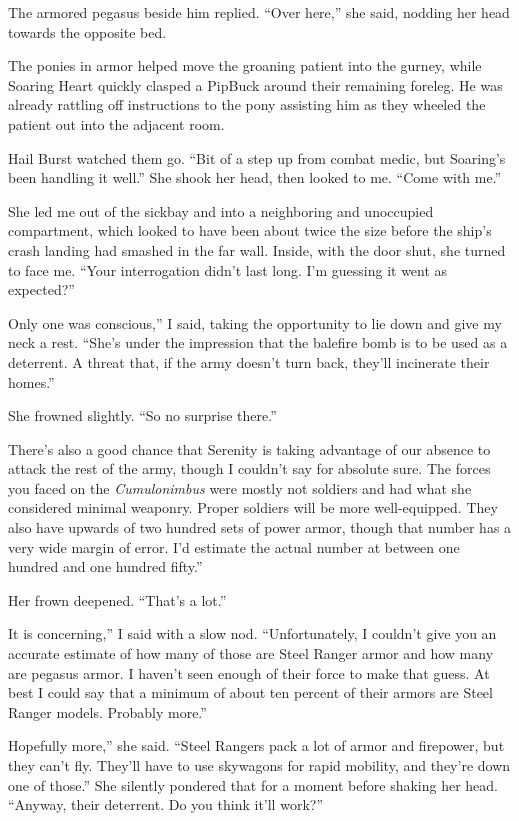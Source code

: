 The armored pegasus beside him replied. “Over here,” she said, nodding her head towards the opposite bed.

The ponies in armor helped move the groaning patient into the gurney, while Soaring Heart quickly clasped a PipBuck around their remaining foreleg. He was already rattling off instructions to the pony assisting him as they wheeled the patient out into the adjacent room.

Hail Burst watched them go. “Bit of a step up from combat medic, but Soaring’s been handling it well.” She shook her head, then looked to me. “Come with me.”

She led me out of the sickbay and into a neighboring and unoccupied compartment, which looked to have been about twice the size before the ship’s crash landing had smashed in the far wall. Inside, with the door shut, she turned to face me. “Your interrogation didn’t last long. I’m guessing it went as expected?”

\leavevmode{}Only one was conscious,” I said, taking the opportunity to lie down and give my neck a rest. “She’s under the impression that the balefire bomb is to be used as a deterrent. A threat that, if the army doesn’t turn back, they’ll incinerate their homes.”

She frowned slightly. “So no surprise there.”

\leavevmode{}There’s also a good chance that Serenity is taking advantage of our absence to attack the rest of the army, though I couldn’t say for absolute sure. The forces you faced on the \textit{Cumulonimbus} were mostly not soldiers and had what she considered minimal weaponry. Proper soldiers will be more well-equipped. They also have upwards of two hundred sets of power armor, though that number has a very wide margin of error. I’d estimate the actual number at between one hundred and one hundred fifty.”

Her frown deepened. “That’s a lot.”

\leavevmode{}It is concerning,” I said with a slow nod. “Unfortunately, I couldn’t give you an accurate estimate of how many of those are Steel Ranger armor and how many are pegasus armor. I haven’t seen enough of their force to make that guess. At best I could say that a minimum of about ten percent of their armors are Steel Ranger models. Probably more.”

\leavevmode{}Hopefully more,” she said. “Steel Rangers pack a lot of armor and firepower, but they can’t fly. They’ll have to use skywagons for rapid mobility, and they’re down one of those.” She silently pondered that for a moment before shaking her head. “Anyway, their deterrent. Do you think it’ll work?”

